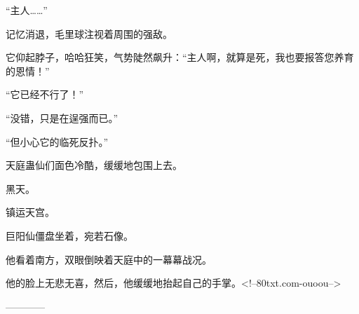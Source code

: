 \begin{this_body}
“主人……”

记忆消退，毛里球注视着周围的强敌。

它仰起脖子，哈哈狂笑，气势陡然飙升：“主人啊，就算是死，我也要报答您养育的恩情！”

“它已经不行了！”

“没错，只是在逞强而已。”

“但小心它的临死反扑。”

天庭蛊仙们面色冷酷，缓缓地包围上去。

黑天。

镇运天宫。

巨阳仙僵盘坐着，宛若石像。

他看着南方，双眼倒映着天庭中的一幕幕战况。

他的脸上无悲无喜，然后，他缓缓地抬起自己的手掌。<!--80txt.com-ouoou-->

------------

\end{this_body}

